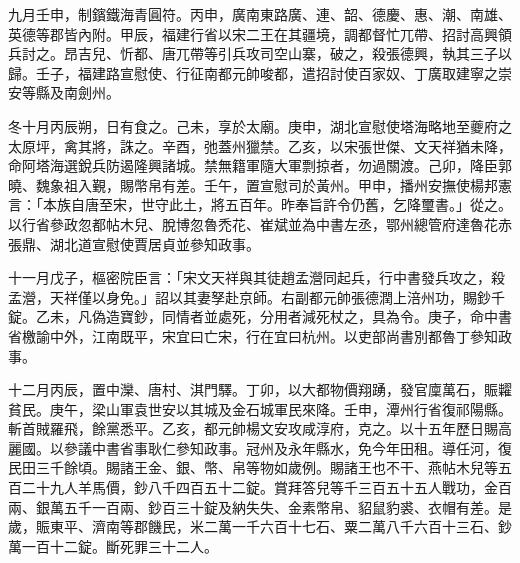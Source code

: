 \begin{pinyinscope}
 九月壬申，制鑌鐵海青圓符。丙申，廣南東路廣、連、韶、德慶、惠、潮、南雄、英德等郡皆內附。甲辰，福建行省以宋二王在其疆境，調都督忙兀帶、招討高興領兵討之。昂吉兒、忻都、唐兀帶等引兵攻司空山寨，破之，殺張德興，執其三子以歸。壬子，福建路宣慰使、行征南都元帥唆都，遣招討使百家奴、丁廣取建寧之崇安等縣及南劍州。



 冬十月丙辰朔，日有食之。己未，享於太廟。庚申，湖北宣慰使塔海略地至夔府之太原坪，禽其將，誅之。辛酉，弛蓋州獵禁。乙亥，以宋張世傑、文天祥猶未降，命阿塔海選銳兵防遏隆興諸城。禁無籍軍隨大軍剽掠者，勿過關渡。己卯，降臣郭曉、魏象祖入覲，賜幣帛有差。壬午，置宣慰司於黃州。甲申，播州安撫使楊邦憲言：「本族自唐至宋，世守此土，將五百年。昨奉旨許令仍舊，乞降璽書。」從之。以行省參政忽都帖木兒、脫博忽魯禿花、崔斌並為中書左丞，鄂州總管府達魯花赤張鼎、湖北道宣慰使賈居貞並參知政事。



 十一月戊子，樞密院臣言：「宋文天祥與其徒趙孟瀯同起兵，行中書發兵攻之，殺孟瀯，天祥僅以身免。」詔以其妻孥赴京師。右副都元帥張德潤上涪州功，賜鈔千錠。乙未，凡偽造寶鈔，同情者並處死，分用者減死杖之，具為令。庚子，命中書省檄諭中外，江南既平，宋宜曰亡宋，行在宜曰杭州。以吏部尚書別都魯丁參知政事。



 十二月丙辰，置中灤、唐村、淇門驛。丁卯，以大都物價翔踴，發官廩萬石，賑糶貧民。庚午，梁山軍袁世安以其城及金石城軍民來降。壬申，潭州行省復祁陽縣。斬首賊羅飛，餘黨悉平。乙亥，都元帥楊文安攻咸淳府，克之。以十五年歷日賜高麗國。以參議中書省事耿仁參知政事。冠州及永年縣水，免今年田租。導任河，復民田三千餘頃。賜諸王金、銀、幣、帛等物如歲例。賜諸王也不干、燕帖木兒等五百二十九人羊馬價，鈔八千四百五十二錠。賞拜答兒等千三百五十五人戰功，金百兩、銀萬五千一百兩、鈔百三十錠及納失失、金素幣帛、貂鼠豹裘、衣帽有差。是歲，賑東平、濟南等郡饑民，米二萬一千六百十七石、粟二萬八千六百十三石、鈔萬一百十二錠。斷死罪三十二人。



\end{pinyinscope}